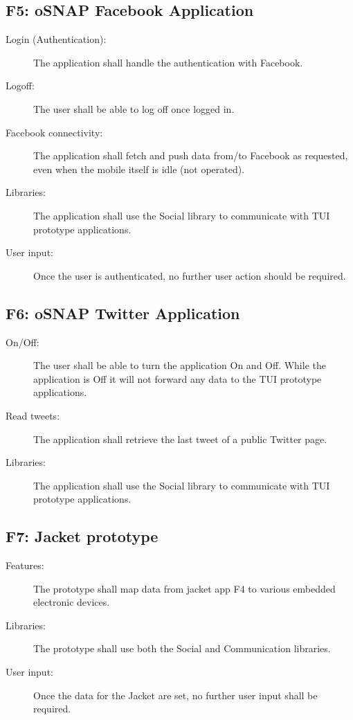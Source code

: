\subsection{F5: oSNAP Facebook Application}
\begin{description}
	\item[Login (Authentication):] The application shall handle the
	authentication with Facebook.
	\item[Logoff:] The user shall be able to log off once logged in.
	\item[Facebook connectivity:] The application shall fetch and push data
	from/to Facebook as requested, even when the mobile itself is idle
	(not operated).
	\item[Libraries:] The application shall use the Social library to
	communicate with TUI prototype applications.
	\item[User input:] Once the user is authenticated, no further user action
	should be required.
\end{description}

\subsection{F6: oSNAP Twitter Application}
\begin{description}
	\item[On/Off:] The user shall be able to turn the application On and Off.
	While the application is Off it will not forward any data to the TUI
	prototype applications.
	\item[Read tweets:] The application shall retrieve the last tweet of a
	public Twitter page.
	\item[Libraries:] The application shall use the Social library to
	communicate with TUI prototype applications.
\end{description}

\subsection{F7: Jacket prototype}
\begin{description}
	\item[Features:] The prototype shall map data from jacket app F4 to various
	embedded electronic devices.
	\item[Libraries:] The prototype shall use both the Social and Communication
	libraries.
	\item[User input:] Once the data for the Jacket are set, no further user
	input shall be required.
\end{description}

